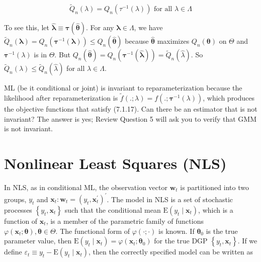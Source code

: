 \documentclass[10pt]{article}
\begin{document}
\begin{equation*}
\widetilde{Q}_{n}(\lambda)=Q_{n}\left(\tau^{-1}(\lambda)\right) \text { for all } \lambda \in \Lambda \tag{7.1.17}
\end{equation*}


To see this, let $\hat{\boldsymbol{\lambda}} \equiv \boldsymbol{\tau}(\hat{\boldsymbol{\theta}})$. For any $\boldsymbol{\lambda} \in \Lambda$, we have $\widetilde{Q}_{n}(\boldsymbol{\lambda})=Q_{n}\left(\boldsymbol{\tau}^{-1}(\boldsymbol{\lambda})\right) \leq Q_{n}(\hat{\boldsymbol{\theta}})$ because $\hat{\boldsymbol{\theta}}$ maximizes $Q_{n}(\boldsymbol{\theta})$ on $\Theta$ and $\boldsymbol{\tau}^{-1}(\lambda)$ is in $\Theta$. But $Q_{n}(\hat{\boldsymbol{\theta}})=Q_{n}\left(\boldsymbol{\tau}^{-1}(\hat{\boldsymbol{\lambda}})\right)= \widetilde{Q}_{n}(\hat{\lambda})$. So $\widetilde{Q}_{n}(\lambda) \leq \widetilde{Q}_{n}(\hat{\lambda})$ for all $\lambda \in \Lambda$.

ML (be it conditional or joint) is invariant to reparameterization because the likelihood after reparameterization is $\tilde{f}(. ; \lambda)=f\left(. ; \boldsymbol{\tau}^{-1}(\lambda)\right)$, which produces the objective functions that satisfy (7.1.17). Can there be an estimator that is not invariant? The answer is yes; Review Question 5 will ask you to verify that GMM is not invariant.

\section*{Nonlinear Least Squares (NLS)}
In NLS, as in conditional ML, the observation vector $\mathbf{w}_{t}$ is partitioned into two groups, $y_{t}$ and $\mathbf{x}_{t}: \mathbf{w}_{t}=\left(y_{t}, \mathbf{x}_{t}^{\prime}\right)^{\prime}$. The model in NLS is a set of stochastic processes $\left\{y_{t}, \mathbf{x}_{t}\right\}$ such that the conditional mean $\mathrm{E}\left(y_{t} \mid \mathbf{x}_{t}\right)$, which is a function of $\mathbf{x}_{t}$, is a member of the parametric family of functions $\varphi\left(\mathbf{x}_{t} ; \boldsymbol{\theta}\right), \boldsymbol{\theta} \in \Theta$. The functional form of $\varphi(\cdot ; \cdot)$ is known. If $\boldsymbol{\theta}_{0}$ is the true parameter value, then $\mathrm{E}\left(y_{t} \mid \mathbf{x}_{t}\right)=\varphi\left(\mathbf{x}_{t} ; \boldsymbol{\theta}_{0}\right)$ for the true DGP $\left\{y_{t}, \mathbf{x}_{t}\right\}$. If we define $\varepsilon_{t} \equiv y_{t}-\mathrm{E}\left(y_{t} \mid \mathbf{x}_{t}\right)$, then the correctly specified model can be written as
\end{document}
